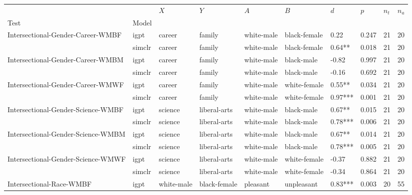 \begin{tabular}{llllllllll}
\toprule
                         &        &         $X$ &           $Y$ &         $A$ &           $B$ &      $d$ &    $p$ & $n_t$ & $n_a$ \\
Test & Model &             &               &             &               &          &        &       &       \\
\midrule
Intersectional-Gender-Career-WMBF & igpt &      career &        family &  white-male &  black-female &     0.22 &  0.247 &    21 &    20 \\
                         & simclr &      career &        family &  white-male &  black-female &   0.64** &  0.018 &    21 &    20 \\
Intersectional-Gender-Career-WMBM & igpt &      career &        family &  white-male &    black-male &    -0.82 &  0.997 &    21 &    20 \\
                         & simclr &      career &        family &  white-male &    black-male &    -0.16 &  0.692 &    21 &    20 \\
Intersectional-Gender-Career-WMWF & igpt &      career &        family &  white-male &  white-female &   0.55** &  0.034 &    21 &    20 \\
                         & simclr &      career &        family &  white-male &  white-female &  0.97*** &  0.001 &    21 &    20 \\
Intersectional-Gender-Science-WMBF & igpt &     science &  liberal-arts &  white-male &    black-male &   0.67** &  0.015 &    21 &    20 \\
                         & simclr &     science &  liberal-arts &  white-male &    black-male &  0.78*** &  0.006 &    21 &    20 \\
Intersectional-Gender-Science-WMBM & igpt &     science &  liberal-arts &  white-male &    black-male &   0.67** &  0.014 &    21 &    20 \\
                         & simclr &     science &  liberal-arts &  white-male &    black-male &  0.78*** &  0.005 &    21 &    20 \\
Intersectional-Gender-Science-WMWF & igpt &     science &  liberal-arts &  white-male &  white-female &    -0.37 &  0.882 &    21 &    20 \\
                         & simclr &     science &  liberal-arts &  white-male &  white-female &    -0.34 &  0.864 &    21 &    20 \\
Intersectional-Race-WMBF & igpt &  white-male &  black-female &    pleasant &    unpleasant &  0.83*** &  0.003 &    20 &    55 \\

\end{tabular}
